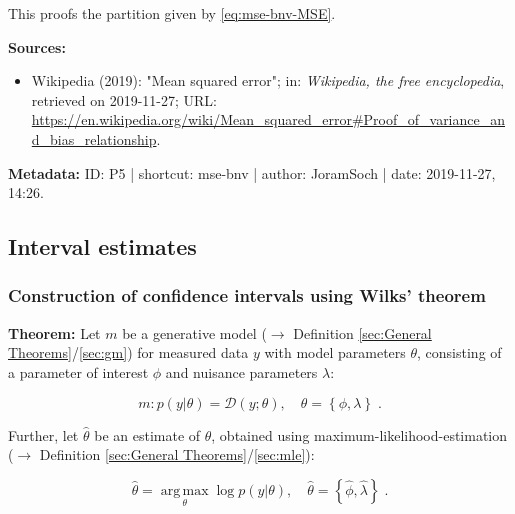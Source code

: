 \documentclass[a4paper,12pt,twoside]{book}
\begin{document}
This proofs the partition given by \eqref{eq:mse-bnv-MSE}.


\vspace{1em}
\textbf{Sources:}
\begin{itemize}
\item Wikipedia (2019): "Mean squared error"; in: \textit{Wikipedia, the free encyclopedia}, retrieved on 2019-11-27; URL: \url{https://en.wikipedia.org/wiki/Mean_squared_error#Proof_of_variance_and_bias_relationship}.
\end{itemize}


\vspace{1em}
\textbf{Metadata:} ID: P5 | shortcut: mse-bnv | author: JoramSoch | date: 2019-11-27, 14:26.
\vspace{1em}



\subsection{Interval estimates}

\subsubsection[\textbf{Construction of confidence intervals using Wilks' theorem}]{Construction of confidence intervals using Wilks' theorem} \label{sec:ci-wilks}
\setcounter{equation}{0}

\textbf{Theorem:} Let $m$ be a generative model ($\rightarrow$ Definition \ref{sec:General Theorems}/\ref{sec:gm}) for measured data $y$ with model parameters $\theta$, consisting of a parameter of interest $\phi$ and nuisance parameters $\lambda$:

\begin{equation} \label{eq:ci-wilks-mod-par}
m: p(y|\theta) = \mathcal{D}(y; \theta), \quad \theta = \left\lbrace \phi, \lambda \right\rbrace \; .
\end{equation}

Further, let $\hat{\theta}$ be an estimate of $\theta$, obtained using maximum-likelihood-estimation ($\rightarrow$ Definition \ref{sec:General Theorems}/\ref{sec:mle}):

\begin{equation} \label{eq:ci-wilks-theta-mle}
\hat{\theta} = \operatorname*{arg\,max}_{\theta} \log p(y|\theta), \quad \hat{\theta} = \left\lbrace \hat{\phi}, \hat{\lambda} \right\rbrace \; .
\end{equation}
\end{document}
